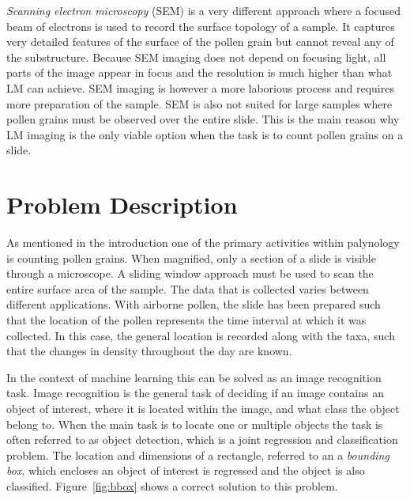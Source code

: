\textit{Scanning electron microscopy} (SEM) is a very different approach where a focused beam of electrons is used to record the surface topology of a sample.
It captures very detailed features of the surface of the pollen grain but cannot reveal any of the substructure.
Because SEM imaging does not depend on focusing light, all parts of the image appear in focus and the resolution is much higher than what LM can achieve.
SEM imaging is however a more laborious process and requires more preparation of the sample.
SEM is also not suited for large samples where pollen grains must be observed over the entire slide.
This is the main reason why LM imaging is the only viable option when the task is to count pollen grains on a slide.

\section{Problem Description}\label{sec:back-problem}



As mentioned in the introduction one of the primary activities within palynology is counting pollen grains.
When magnified, only a section of a slide is visible through a microscope.
A sliding window approach must be used to scan the entire surface area of the sample.
The data that is collected varies between different applications.
With airborne pollen, the slide has been prepared such that the location of the pollen represents the time interval at which it was collected.
In this case, the general location is recorded along with the taxa, such that the changes in density throughout the day are known.

In the context of machine learning this can be solved as an image recognition task.
Image recognition is the general task of deciding if an image contains an object of interest, where it is located within the image, and what class the object belong to.
When the main task is to locate one or multiple objects the task is often referred to as object detection, which is a joint regression and classification problem.
The location and dimensions of a rectangle, referred to an a \textit{bounding box}, which encloses an object of interest is regressed and the object is also classified.
Figure~\ref{fig:bbox} shows a correct solution to this problem.

